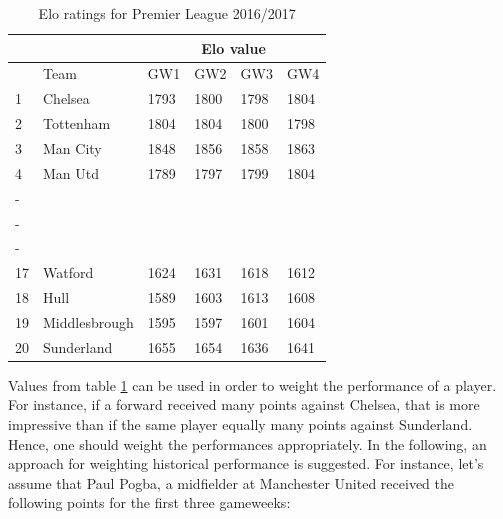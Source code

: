\begin{table}[H]
\centering
\caption{Elo ratings for Premier League 2016/2017}
\label{Elo.1617}
\begin{tabular}{|l|l|l|l|l|l|}
\cline{2-6}
\multicolumn{1}{l|}{} & \multicolumn{1}{l|}{} & \multicolumn{4}{c|}{Elo value}  \\ \cline{2-6} 
\hline
                      & Team                  & GW1    & GW2    & GW3  & GW4    \\
                      \hline
1                     & Chelsea               & 1793   & 1800   & 1798 & 1804   \\
2                     & Tottenham             & 1804   & 1804   & 1800 & 1798   \\
3                     & Man City              & 1848   & 1856   & 1858 & 1863   \\
4                     & Man Utd               & 1789   & 1797   & 1799 & 1804   \\
-                     &                       &        &        &      &        \\
-                     &                       &        &        &      &        \\
-                     &                       &        &        &      &        \\
17                    & Watford               & 1624   & 1631   & 1618 & 1612   \\
18                    & Hull                  & 1589   & 1603   & 1613 & 1608   \\
19                    & Middlesbrough         & 1595   & 1597   & 1601 & 1604   \\
20                    & Sunderland            & 1655   & 1654   & 1636 & 1641   \\
\hline
\end{tabular}
\end{table}

Values from table \ref{Elo.1617} can be used in order to weight the performance of a player. For instance, if a forward received many points against Chelsea, that is more impressive than if the same player equally many points against Sunderland. Hence, one should weight the performances appropriately. In the following, an approach for weighting historical performance is suggested. For instance, let's assume that Paul Pogba, a midfielder at Manchester United received the following points for the first three gameweeks: 


